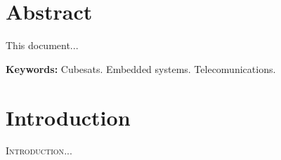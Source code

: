 \documentclass[12pt]{book}
\begin{document}
\chapter*{Abstract}

This document...

\smallskip
\noindent \textbf{Keywords:} Cubesats. Embedded systems. Telecomunications.

\tableofcontents


\listoffigures
{}


\listoftables
{}


\printnomenclature
{}


\chapter{Introduction}


\lettrine{I}{ntroduction}...
\end{document}
